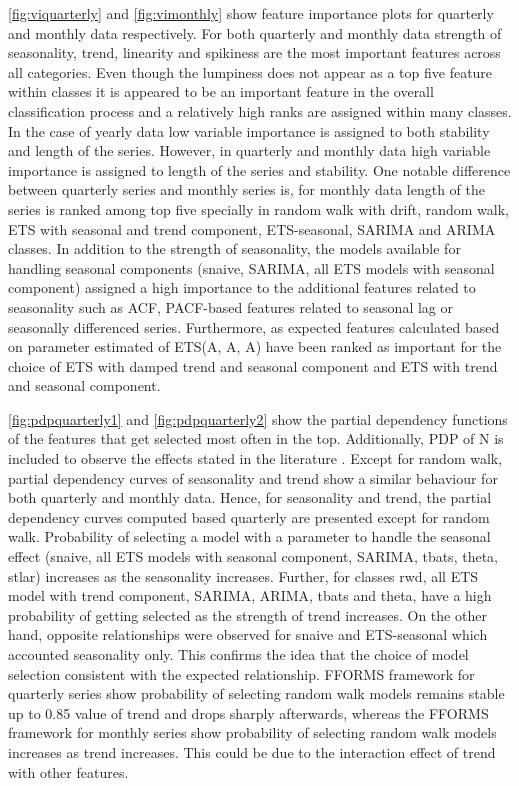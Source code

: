 \documentclass[11pt,a4paper,]{article}
\begin{document}
\autoref{fig:viquarterly} and \autoref{fig:vimonthly} show feature
importance plots for quarterly and monthly data respectively. For both
quarterly and monthly data strength of seasonality, trend, linearity and
spikiness are the most important features across all categories. Even
though the lumpiness does not appear as a top five feature within
classes it is appeared to be an important feature in the overall
classification process and a relatively high ranks are assigned within
many classes. In the case of yearly data low variable importance is
assigned to both stability and length of the series. However, in
quarterly and monthly data high variable importance is assigned to
length of the series and stability. One notable difference between
quarterly series and monthly series is, for monthly data length of the
series is ranked among top five specially in random walk with drift,
random walk, ETS with seasonal and trend component, ETS-seasonal, SARIMA
and ARIMA classes. In addition to the strength of seasonality, the
models available for handling seasonal components (snaive, SARIMA, all
ETS models with seasonal component) assigned a high importance to the
additional features related to seasonality such as ACF, PACF-based
features related to seasonal lag or seasonally differenced series.
Furthermore, as expected features calculated based on parameter
estimated of ETS(A, A, A) have been ranked as important for the choice
of ETS with damped trend and seasonal component and ETS with trend and
seasonal component.

\autoref{fig:pdpquarterly1} and \autoref{fig:pdpquarterly2} show the
partial dependency functions of the features that get selected most
often in the top. Additionally, PDP of N is included to observe the
effects stated in the literature \autocite{makridakis2000m3}. Except for
random walk, partial dependency curves of seasonality and trend show a
similar behaviour for both quarterly and monthly data. Hence, for
seasonality and trend, the partial dependency curves computed based
quarterly are presented except for random walk. Probability of selecting
a model with a parameter to handle the seasonal effect (snaive, all ETS
models with seasonal component, SARIMA, tbats, theta, stlar) increases
as the seasonality increases. Further, for classes rwd, all ETS model
with trend component, SARIMA, ARIMA, tbats and theta, have a high
probability of getting selected as the strength of trend increases. On
the other hand, opposite relationships were observed for snaive and
ETS-seasonal which accounted seasonality only. This confirms the idea
that the choice of model selection consistent with the expected
relationship. FFORMS framework for quarterly series show probability of
selecting random walk models remains stable up to 0.85 value of trend
and drops sharply afterwards, whereas the FFORMS framework for monthly
series show probability of selecting random walk models increases as
trend increases. This could be due to the interaction effect of trend
with other features.
\end{document}
